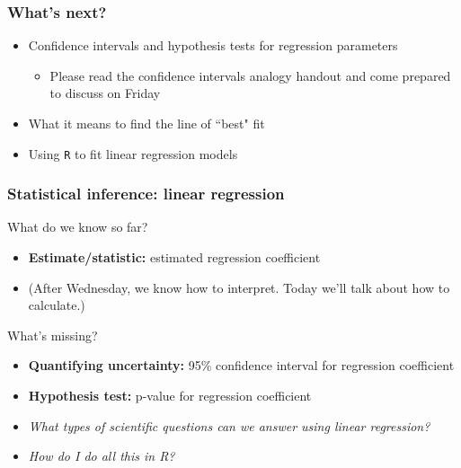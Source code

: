 \documentclass[12pt, 
hyperref={colorlinks=true, linkcolor=blue, urlcolor=cyan}]{beamer}
\begin{document}
\begin{frame}
\frametitle{What's next?}

\begin{itemize}
\item Confidence intervals and hypothesis tests for regression parameters
	\begin{itemize}
	\item \color{blue} Please read the confidence intervals analogy handout and come prepared to discuss on Friday \color{black}
	\end{itemize}
\item What it means to find the line of ``best" fit
\item Using \texttt{R} to fit linear regression models 
\end{itemize}

\end{frame}

\begin{frame}
\frametitle{Statistical inference: linear regression}

\color{blue} What do we know so far? \color{black}%
\begin{itemize}
\item \textbf{Estimate/statistic:} estimated regression coefficient
\item[] (After Wednesday, we know how to interpret. Today we'll talk about how to calculate.)
\end{itemize}

\color{blue} What's missing? \color{black}\pause %
\begin{itemize}
\item \textbf{Quantifying uncertainty:} 95\% confidence interval for regression coefficient
\item \textbf{Hypothesis test:} p-value for regression coefficient \pause
\item \textit{What types of scientific questions can we answer using linear regression?}
\item \textit{How do I do all this in R?}
\end{itemize}

\end{frame}


\end{document}
